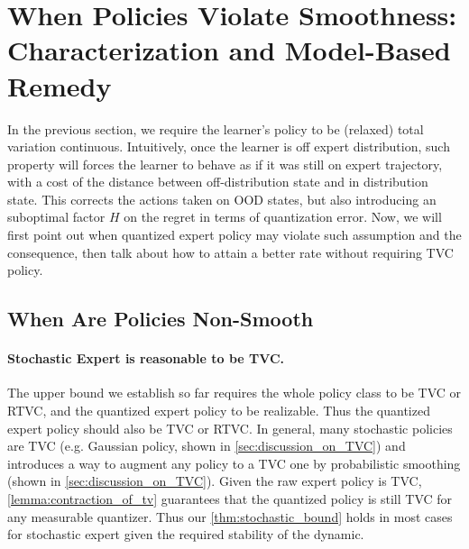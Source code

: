 \documentclass{article}
\let\oldparagraph\paragraph
\renewcommand{\paragraph}[1]{\oldparagraph{#1.}}
\begin{document}
\section{When Policies Violate Smoothness: Characterization and Model-Based Remedy}\label{sec:unsmooth_policy}
In the previous section, we require the learner's policy to be (relaxed) total variation continuous. Intuitively, once the learner is off expert distribution, such property will forces the learner to behave as if it was still on expert trajectory, with a cost of the distance between off-distribution state and in distribution state. This corrects the actions taken on OOD states, but also introducing an suboptimal factor $H$ on the regret in terms of quantization error. Now, we will first point out when quantized expert policy may violate such assumption and the consequence, then talk about how to attain a better rate without requiring TVC policy. 



\subsection{When Are Policies Non-Smooth}
\paragraph{Stochastic Expert is reasonable to be TVC}
The upper bound we establish so far requires the whole policy class to be TVC or RTVC, and the quantized expert policy to be realizable. Thus the quantized expert policy should also be TVC or RTVC. In general, many stochastic policies are TVC (e.g. Gaussian policy, shown in \cref{sec:discussion_on_TVC}) and \citet{block2023provable} introduces a way to augment any policy to a TVC one by probabilistic smoothing (shown in \cref{sec:discussion_on_TVC}). Given the raw expert policy is TVC, \cref{lemma:contraction_of_tv} guarantees that the quantized policy is still TVC for any measurable quantizer. Thus our \cref{thm:stochastic_bound} holds in most cases for stochastic expert given the required stability of the dynamic.
\end{document}
